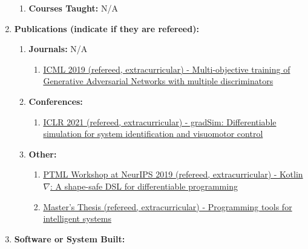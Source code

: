 \documentclass[11pt]{article}
\begin{document}
\begin{enumerate}
\begin{enumerate}
            \item \textbf{Courses Taught:} N/A

        \end{enumerate}

        \item \textbf{Publications (indicate if they are refereed):}
        \begin{enumerate}
            \item \textbf{Journals:} N/A
            \begin{enumerate}
            \item \href{http://proceedings.mlr.press/v97/albuquerque19a/albuquerque19a.pdf}{ICML 2019 (refereed, extracurricular) - Multi-objective training of Generative Adversarial Networks with multiple discriminators}
            \end{enumerate}
            \item \textbf{Conferences:}
            \begin{enumerate}
            \item \href{https://openreview.net/forum?id=c_E8kFWfhp0}{ICLR 2021 (refereed, extracurricular) - gradSim: Differentiable simulation for system identification and visuomotor control}
            \end{enumerate}

            \item \textbf{Other:}
            \begin{enumerate}
                \item \href{https://openreview.net/forum?id=SkluMSZ08H}{PTML Workshop at NeurIPS 2019 (refereed, extracurricular) - Kotlin$\nabla$: A shape-safe DSL for differentiable programming}
                \item \href{http://breandan.net/public/masters_thesis.pdf}{Master's Thesis (refereed, extracurricular) - Programming tools for intelligent systems}
            \end{enumerate}

        \end{enumerate}

        \item \textbf{Software or System Built:}


\end{enumerate}
\end{document}
